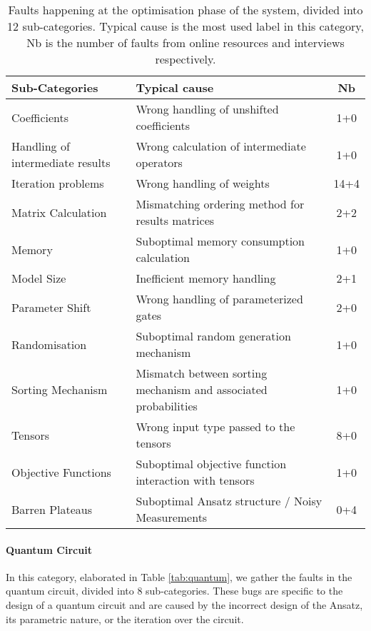 \begin{table}[hbt!]
    \centering
        \caption{Faults happening at the optimisation phase of the system, divided into 12 sub-categories. Typical cause is the most used label in this category, Nb is the number of faults from online resources and interviews respectively.}
    \label{tab:training}
    \begin{tabular}{p{3cm}|p{8cm}|c}
       \textbf{Sub-Categories} & \textbf{Typical cause} & \textbf{Nb} \\
         \hline
       Coefficients  & Wrong handling of unshifted coefficients & 1+0 \\
         \hline
      Handling of intermediate results  & Wrong calculation of intermediate operators &  1+0 \\
         \hline
        Iteration problems & Wrong handling of weights & 14+4 \\
          \hline
        Matrix Calculation & Mismatching ordering method for results  matrices  & 2+2 \\
          \hline
        Memory & Suboptimal memory consumption calculation & 1+0 \\
          \hline
        Model Size & Inefficient memory handling & 2+1 \\
          \hline
        Parameter Shift & Wrong handling of parameterized gates & 2+0 \\
          \hline
        Randomisation & Suboptimal random generation mechanism & 1+0 \\
         \hline
        Sorting Mechanism & Mismatch between sorting mechanism and associated probabilities &  1+0 \\
         \hline
        Tensors & Wrong input type passed to the tensors  & 8+0 \\
         \hline
        Objective Functions & Suboptimal objective function interaction with tensors &  1+0 \\
         \hline
        Barren Plateaus & Suboptimal Ansatz structure / Noisy Measurements &  0+4 \\
    \end{tabular}
\end{table}


\paragraph{Quantum Circuit}
In this category, elaborated in Table \ref{tab:quantum}, we gather the faults in the quantum circuit, divided into 8 sub-categories. These bugs are specific to the design of a quantum circuit and are caused by the incorrect design of the Ansatz, its parametric nature, or the iteration over the circuit. 

